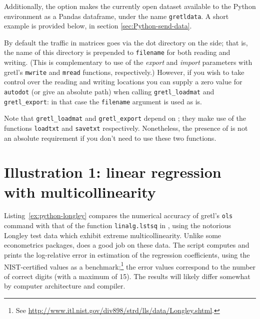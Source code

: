 Additionally, the  option makes the currently open
dataset available to the Python environment as a Pandas dataframe,
under the name \texttt{gretldata}. A short example is provided below,
in section \ref{sec:Python-send-data}.

By default the traffic in matrices goes via the dot directory on the
 side; that is, the name of this directory is prepended to
\texttt{filename} for both reading and writing. (This is complementary
to use of the \textsl{export} and \textsl{import} parameters with
gretl's \texttt{mwrite} and \texttt{mread} functions, respectively.)
However, if you wish to take control over the reading and writing
locations you can supply a zero value for \texttt{autodot} (or give an
absolute path) when calling \verb|gretl_loadmat| and
\verb|gretl_export|: in that case the \texttt{filename} argument is
used as is.

Note that \verb|gretl_loadmat| and \verb|gretl_export| depend on
; they make use of the functions \texttt{loadtxt} and
\texttt{savetxt} respectively. Nonetheless, the presence of
 is not an absolute requirement if you don't need
to use these two functions.

\section{Illustration 1: linear regression with multicollinearity}
\label{sec:Python-longley}

Listing~\ref{ex:python-longley} compares the numerical accuracy of
gretl's \texttt{ols} command with that of the function
\texttt{linalg.lstsq} in , using the notorious Longley test
data which exhibit extreme multicollinearity.  Unlike some
econometrics packages,  does a good job on these data. The
script computes and prints the log-relative error in estimation of the
regression coefficients, using the NIST-certified values as a
benchmark;\footnote{See
  \url{http://www.itl.nist.gov/div898/strd/lls/data/Longley.shtml}.}
the error values correspond to the number of correct digits (with a
maximum of 15). The results will likely differ somewhat by computer
architecture and compiler.

